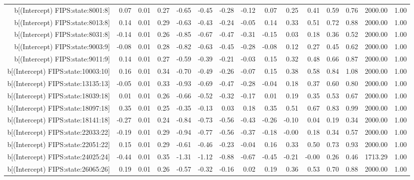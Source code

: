 \begin{table}[ht]
\begin{tabular}{rrrrrrrrrrrrrrr}
  b[(Intercept) FIPS:state:8001:8] & 0.07 & 0.01 & 0.27 & -0.65 & -0.45 & -0.28 & -0.12 & 0.07 & 0.25 & 0.41 & 0.59 & 0.76 & 2000.00 & 1.00 \\ 
  b[(Intercept) FIPS:state:8013:8] & 0.14 & 0.01 & 0.29 & -0.63 & -0.43 & -0.24 & -0.05 & 0.14 & 0.33 & 0.51 & 0.72 & 0.88 & 2000.00 & 1.00 \\ 
  b[(Intercept) FIPS:state:8031:8] & -0.14 & 0.01 & 0.26 & -0.85 & -0.67 & -0.47 & -0.31 & -0.15 & 0.03 & 0.18 & 0.36 & 0.52 & 2000.00 & 1.00 \\ 
  b[(Intercept) FIPS:state:9003:9] & -0.08 & 0.01 & 0.28 & -0.82 & -0.63 & -0.45 & -0.28 & -0.08 & 0.12 & 0.27 & 0.45 & 0.62 & 2000.00 & 1.00 \\ 
  b[(Intercept) FIPS:state:9011:9] & 0.14 & 0.01 & 0.27 & -0.59 & -0.39 & -0.21 & -0.03 & 0.15 & 0.32 & 0.48 & 0.66 & 0.87 & 2000.00 & 1.00 \\ 
  b[(Intercept) FIPS:state:10003:10] & 0.16 & 0.01 & 0.34 & -0.70 & -0.49 & -0.26 & -0.07 & 0.15 & 0.38 & 0.58 & 0.84 & 1.08 & 2000.00 & 1.00 \\ 
  b[(Intercept) FIPS:state:13135:13] & -0.05 & 0.01 & 0.33 & -0.93 & -0.69 & -0.47 & -0.28 & -0.04 & 0.18 & 0.37 & 0.60 & 0.80 & 2000.00 & 1.00 \\ 
  b[(Intercept) FIPS:state:18039:18] & 0.01 & 0.01 & 0.26 & -0.66 & -0.52 & -0.32 & -0.17 & 0.01 & 0.19 & 0.35 & 0.53 & 0.67 & 2000.00 & 1.00 \\ 
  b[(Intercept) FIPS:state:18097:18] & 0.35 & 0.01 & 0.25 & -0.35 & -0.13 & 0.03 & 0.18 & 0.35 & 0.51 & 0.67 & 0.83 & 0.99 & 2000.00 & 1.00 \\ 
  b[(Intercept) FIPS:state:18141:18] & -0.27 & 0.01 & 0.24 & -0.84 & -0.73 & -0.56 & -0.43 & -0.26 & -0.10 & 0.04 & 0.19 & 0.34 & 2000.00 & 1.00 \\ 
  b[(Intercept) FIPS:state:22033:22] & -0.19 & 0.01 & 0.29 & -0.94 & -0.77 & -0.56 & -0.37 & -0.18 & -0.00 & 0.18 & 0.34 & 0.57 & 2000.00 & 1.00 \\ 
  b[(Intercept) FIPS:state:22051:22] & 0.15 & 0.01 & 0.29 & -0.61 & -0.46 & -0.23 & -0.04 & 0.16 & 0.33 & 0.50 & 0.73 & 0.93 & 2000.00 & 1.00 \\ 
  b[(Intercept) FIPS:state:24025:24] & -0.44 & 0.01 & 0.35 & -1.31 & -1.12 & -0.88 & -0.67 & -0.45 & -0.21 & -0.00 & 0.26 & 0.46 & 1713.29 & 1.00 \\ 
  b[(Intercept) FIPS:state:26065:26] & 0.19 & 0.01 & 0.26 & -0.57 & -0.32 & -0.16 & 0.02 & 0.19 & 0.36 & 0.53 & 0.70 & 0.88 & 2000.00 & 1.00 \\ 

\end{tabular}
\end{table}
